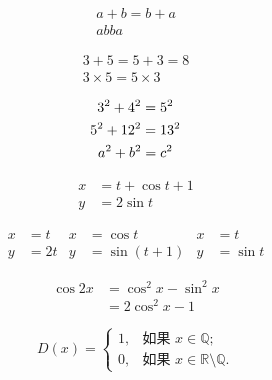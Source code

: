 \documentclass{ctexart}
\begin{document}
    \begin{gather}
        a + b = b + a \\
        ab ba
    \end{gather}

    \begin{gather*}
        3+5 = 5+3 = 8 \\
        3 \times 5 = 5 \times 3
    \end{gather*}

    \begin{gather}
        3^2 + 4^2 = 5^2 \notag \\
        5^2 + 12^2 = 13^2 \notag \\
        a^2 + b^2 = c^2
    \end{gather}

    \begin{align}
        x &= t + \cos t + 1 \\
        y &= 2\sin t
    \end{align}

    \begin{align*}
        x &= t & x &= \cos t & x &= t \\ %
        y &= 2t & y &= \sin(t+1) & y &= \sin t
    \end{align*}

    \begin{equation}
    \begin{split}
        \cos 2x &= \cos^2 x - \sin^2 x \\
        &= 2\cos^2 x - 1
    \end{split}
    \end{equation}

    \begin{equation}
    D(x) = \begin{cases}
        1, & \text{如果 } x \in \mathbb{Q}; \\ %
        0, & \text{如果 } x \in \mathbb{R}\setminus\mathbb{Q}. 
    \end{cases}
    \end{equation}
\end{document}
